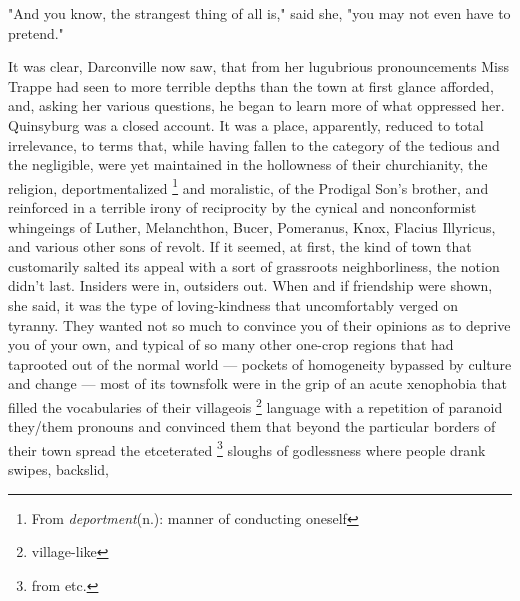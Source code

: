   "And you know, the strangest thing of all is," said she, "you may not even
have to pretend."

  It was clear, Darconville now saw, that from her lugubrious 
pronouncements Miss Trappe had seen to more terrible depths than the town at first glance
afforded, and, asking her various questions, he began to learn more of what
oppressed her. Quinsyburg was a closed account. It was a place, apparently,
reduced to total irrelevance, to terms that, while having fallen to the category
of the tedious and the negligible, were yet maintained in the hollowness of
their churchianity, the religion, deportmentalized 
\footnote{ \textdbend From \textit{deportment}(n.): manner of conducting 
  oneself}
and moralistic, of the Prodigal Son's brother, and reinforced in a terrible 
irony of reciprocity by the cynical and nonconformist whingeings 
of Luther, Melanchthon, Bucer, Pomeranus, Knox, Flacius Illyricus, and various 
other sons of revolt. If it seemed, at
first, the kind of town that customarily salted its appeal with a sort of
grassroots neighborliness, the notion didn't last. Insiders were in, outsiders
out. When and if friendship were shown, she said, it was the type of
loving-kindness that uncomfortably verged 
on tyranny. They wanted not so much to
convince you of their opinions as to deprive you of your own, and typical of so
many other one-crop regions that had taprooted 
out of the normal world --- pockets of homogeneity bypassed by culture and 
change --- most of its townsfolk were in the grip of an acute xenophobia 
that filled the vocabularies of their villageois
\footnote{ village-like}
language with a repetition of paranoid they/them pronouns and convinced them
that beyond the particular borders of their town spread the etceterated 
\footnote{ from etc.}
sloughs
of godlessness where people drank swipes, 
backslid, 
